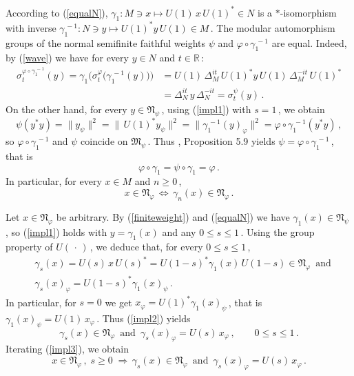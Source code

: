 \documentclass[reqno]{amsart}
\theoremstyle{definition}
\theoremstyle{remark}
\numberwithin{equation}{section}
\theoremstyle{plain}
\begin{document}
According to (\ref{equalN}), $\gamma_1 : M\ni x\longmapsto U(1)\, x
\, U(1)^*\in N$ is a $*$-isomorphism with inverse $\gamma_1^{\, -1} :
N\ni y\longmapsto U(1)^* y\, U(1)\in M\,$. The modular automorphism
groups of the normal semifinite faithful weights $\psi$ and
$\varphi\circ\gamma_1^{\, -1}$ are equal. Indeed, by (\ref{wave}) we
have for every $y\in N$ and $t\in\mathbb R\,$:
\begin{align*}
\sigma^{\varphi\circ\gamma_1^{\, -1}}_t (y)=
\gamma_1\Big( \sigma^\varphi_t \big( \gamma_1^{\, -1} (y)\big)\Big)
&=U(1)\,\Delta_M^{it}\, U(1)^* y\, U(1)\,\Delta_M^{-it}\, U(1)^* \\
&=\Delta_N^{it}\, y\,\Delta_N^{-it} =\sigma^\psi_t (y)\, .
\end{align*}
On the other hand, for every $y\in\mathfrak N_\psi\,$, using
(\ref{impl1}) with $s=1\,$, we obtain
\begin{equation*}
\psi (y^*y)=\| y_\psi\|^2 =\|\, U(1)^* y_\psi\|^2 =\|\gamma_1^{\, -1}
(y)_\varphi\|^2 =\varphi\circ\gamma_1^{\, -1}(y^*y)\, ,
\end{equation*}
so $\varphi\circ\gamma_1^{\, -1}$ and $\psi$ coincide on
$\mathfrak M_\psi\,$. Thus \cite{P-T}, Proposition 5.9 yields
$\psi =\varphi\circ\gamma_1^{\, -1}\,$, that is
\begin{equation}\label{1inv}
\varphi\circ\gamma_1 =\psi\circ\gamma_1 =\varphi\, .
\end{equation}
In particular, for every $x\in M$ and $n\geq 0\,$,
\begin{equation}\label{finiteweight}
x\in\mathfrak N_\varphi\,\Longleftrightarrow\,\gamma_n (x)\in
\mathfrak N_\varphi\, .
\end{equation}

Let $x\in\mathfrak N_\varphi$ be arbitrary. By
(\ref{finiteweight}) and (\ref{equalN}) we have $\gamma_1 (x)\in
\mathfrak N_\psi\,$, so (\ref{impl1}) holds with $y=\gamma_1 (x)$
and any $0\leq s\leq 1\,$. Using the group property of
$U(\,\cdot\, )\,$, we deduce that, for every $0\leq s\leq 1\,$,
\begin{equation}\label{impl2}
\begin{split}
&\gamma_s (x) = U(s)\, x\, U(s)^* =
U(1-s)^* \gamma_1 (x)\, U(1-s)\in\mathfrak N_\varphi\,\text{ and} \\
&\gamma_s (x)_\varphi =U(1-s)^* \gamma_1 (x)_\psi\, .
\end{split}
\end{equation}
In particular, for $s=0$ we get $x_\varphi =U(1)^* \gamma_1 (x)_\psi
\,$, that is $\gamma_1 (x)_\psi =U(1)\, x_\varphi\,$. Thus
(\ref{impl2}) yields
\begin{equation}\label{impl3}
\gamma_s (x)\in\mathfrak N_\varphi\,\text{ and }\,\gamma_s
(x)_\varphi =U(s)\, x_\varphi\, ,\qquad 0\leq s\leq 1\, .
\end{equation}
Iterating (\ref{impl3}), we obtain
\begin{equation}\label{impl4}
x\in\mathfrak N_\varphi\, ,\; s\geq 0\;\Longrightarrow\,
\gamma_s (x)\in\mathfrak N_\varphi\,\text{ and }\,\gamma_s
(x)_\varphi =U(s)\, x_\varphi\, .
\end{equation}
\end{document}

